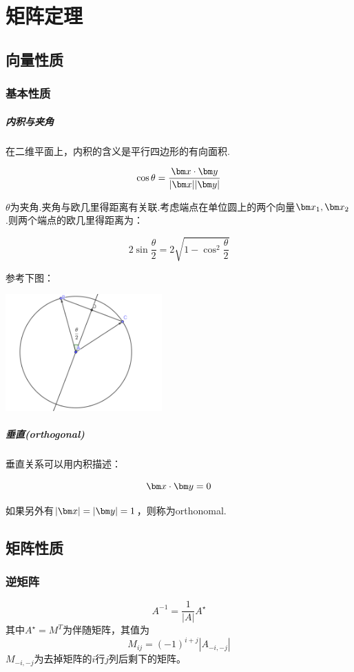 \chapter{矩阵定理}

\section{向量性质}

\subsection{基本性质}

\paragraph*{内积与夹角}在二维平面上，内积的含义是平行四边形的有向面积.

$$\cos\theta=\frac{\bx\cdot\by}{|\bx||\by|}$$

$\theta$为夹角.夹角与欧几里得距离有关联.考虑端点在单位圆上的两个向量$\bx_1,\bx_2$.则两个端点的欧几里得距离为：

$$2\sin\frac{\theta}{2}=2\sqrt{1-\cos^2\frac{\theta}{2}}$$

参考下图：

\begin{center}
	\includegraphics[width=6cm]{figure/cosDistance.png}
\end{center}

\paragraph*{垂直(orthogonal)}垂直关系可以用内积描述：

$$\bx\cdot\by=0$$

如果另外有$|\bx|=|\by|=1$，则称为orthonomal.
\section{矩阵性质}

\subsection{逆矩阵}
$$A^{-1}=\frac{1}{|A|}A^{\star}$$
其中$A^{\star}=M^T$为伴随矩阵，其值为
$$M_{ij}=(-1)^{i+j}|A_{-i,-j}|$$
$M_{-i,-j}$为去掉矩阵的$i$行$j$列后剩下的矩阵。

